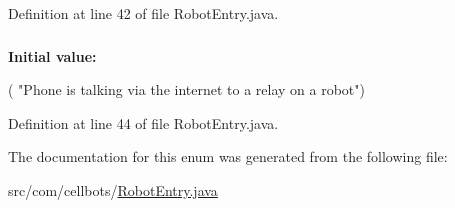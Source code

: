 Definition at line 42 of file Robot\-Entry.\-java.

\hypertarget{enumcom_1_1cellbots_1_1_robot_entry_1_1_usage_ac658e6af9e7d6189350cfa1c9b95c6db}{
\subsubsection[{W\-E\-B\-\_\-\-C\-O\-N\-T\-R\-O\-L}]{}}\label{enumcom_1_1cellbots_1_1_robot_entry_1_1_usage_ac658e6af9e7d6189350cfa1c9b95c6db}
{\bfseries Initial value\-:}
\begin{DoxyCode}
(
                                "Phone is talking via the internet to a relay
       on a robot")
\end{DoxyCode}


Definition at line 44 of file Robot\-Entry.\-java.



The documentation for this enum was generated from the following file\-:\begin{DoxyCompactItemize}
\item 
src/com/cellbots/\hyperlink{_robot_entry_8java}{Robot\-Entry.\-java}\end{DoxyCompactItemize}
